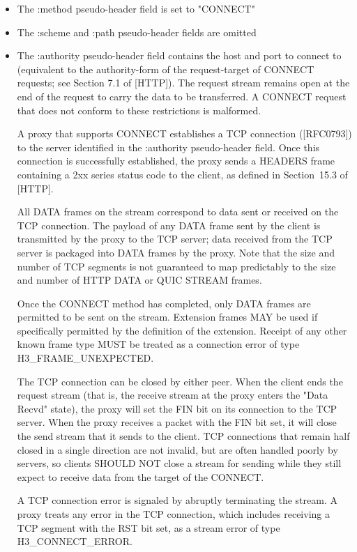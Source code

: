 \documentclass{article}
\begin{document}
\begin{itemize}
\item The :method pseudo-header field is set to "CONNECT"
\item The :scheme and :path pseudo-header fields are omitted
\item The :authority pseudo-header field contains the host and port to connect to (equivalent to the authority-form of the request-target of CONNECT requests; see Section 7.1 of [HTTP]).
The request stream remains open at the end of the request to carry the data to be transferred.  A CONNECT request that does not conform to these restrictions is malformed.

A proxy that supports CONNECT establishes a TCP connection ([RFC0793]) to the server identified in the :authority pseudo-header field.  Once this connection is successfully established, the proxy sends a HEADERS frame containing a 2xx series status code to the client, as defined in Section~15.3 of [HTTP].

All DATA frames on the stream correspond to data sent or received on the TCP connection.  The payload of any DATA frame sent by the client is transmitted by the proxy to the TCP server; data received from the TCP server is packaged into DATA frames by the proxy.  Note that the size and number of TCP segments is not guaranteed to map predictably to the size and number of HTTP DATA or QUIC STREAM frames.

Once the CONNECT method has completed, only DATA frames are permitted to be sent on the stream.  Extension frames MAY be used if specifically permitted by the definition of the extension.  Receipt of any other known frame type MUST be treated as a connection error of type H3\_FRAME\_UNEXPECTED.

The TCP connection can be closed by either peer.  When the client ends the request stream (that is, the receive stream at the proxy enters the "Data Recvd" state), the proxy will set the FIN bit on its connection to the TCP server.  When the proxy receives a packet with the FIN bit set, it will close the send stream that it sends to the client.  TCP connections that remain half closed in a single direction are not invalid, but are often handled poorly by servers, so clients SHOULD NOT close a stream for sending while they still expect to receive data from the target of the CONNECT.

A TCP connection error is signaled by abruptly terminating the stream.  A proxy treats any error in the TCP connection, which includes receiving a TCP segment with the RST bit set, as a stream error of type H3\_CONNECT\_ERROR.


\end{itemize}
\end{document}
